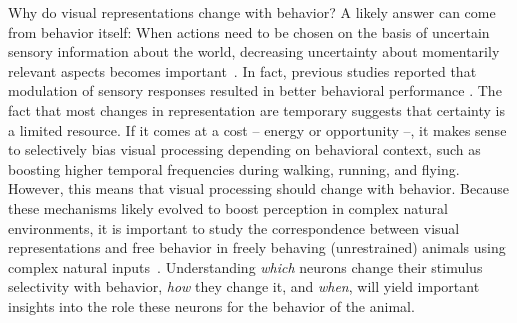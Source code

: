 \documentclass[B2,COG]{ercgrant}
\begin{document}
Why do visual representations change with behavior? 
A likely answer can come from behavior itself:
When actions need to be chosen on the basis of uncertain sensory information about the world, decreasing uncertainty about momentarily relevant aspects becomes important~\parencite{Chebolu2022-tb}. 
In fact, previous studies reported that modulation of sensory responses resulted in better behavioral performance \parencite{Spitzer1988-kq, Bennett2013-rk, Dadarlat2017-jw, De_Gee2022-ir}.
The fact that most changes in representation are temporary suggests that certainty is a limited resource.
If it comes at a cost -- energy or opportunity --, it makes sense to selectively bias visual processing depending on behavioral context, such as boosting higher temporal frequencies during walking, running, and flying.
However, this means that visual processing should change with behavior.
Because these mechanisms likely evolved to boost perception in complex natural environments, it is important to study the correspondence between visual representations and free behavior in freely behaving (unrestrained) animals using complex natural  inputs~\parencite[\eg][]{Parker2022-ac, Huk2018-ez, Datta2019-qj}.
Understanding \textit{which} neurons change their stimulus selectivity with behavior, \textit{how} they change it, and \textit{when}, will yield important insights into the role these neurons for the behavior of the animal. 
\end{document}
